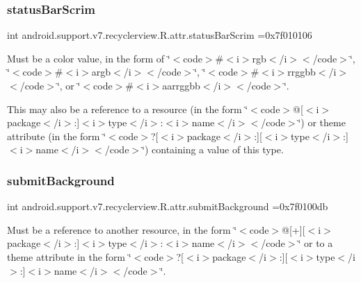 \subsubsection{\texorpdfstring{status\+Bar\+Scrim}{statusBarScrim}}
{\footnotesize\ttfamily int android.\+support.\+v7.\+recyclerview.\+R.\+attr.\+status\+Bar\+Scrim =0x7f010106\hspace{0.3cm}{\ttfamily [static]}}

Must be a color value, in the form of \char`\"{}$<$code$>$\#$<$i$>$rgb$<$/i$>$$<$/code$>$\char`\"{}, \char`\"{}$<$code$>$\#$<$i$>$argb$<$/i$>$$<$/code$>$\char`\"{}, \char`\"{}$<$code$>$\#$<$i$>$rrggbb$<$/i$>$$<$/code$>$\char`\"{}, or \char`\"{}$<$code$>$\#$<$i$>$aarrggbb$<$/i$>$$<$/code$>$\char`\"{}. 

This may also be a reference to a resource (in the form \char`\"{}$<$code$>$@\mbox{[}$<$i$>$package$<$/i$>$\+:\mbox{]}$<$i$>$type$<$/i$>$\+:$<$i$>$name$<$/i$>$$<$/code$>$\char`\"{}) or theme attribute (in the form \char`\"{}$<$code$>$?\mbox{[}$<$i$>$package$<$/i$>$\+:\mbox{]}\mbox{[}$<$i$>$type$<$/i$>$\+:\mbox{]}$<$i$>$name$<$/i$>$$<$/code$>$\char`\"{}) containing a value of this type. \mbox{\label{classandroid_1_1support_1_1v7_1_1recyclerview_1_1R_1_1attr_aa40fe069aae9a3cedc2e2e498e2bdb08}} 
\subsubsection{\texorpdfstring{submit\+Background}{submitBackground}}
{\footnotesize\ttfamily int android.\+support.\+v7.\+recyclerview.\+R.\+attr.\+submit\+Background =0x7f0100db\hspace{0.3cm}{\ttfamily [static]}}

Must be a reference to another resource, in the form \char`\"{}$<$code$>$@\mbox{[}+\mbox{]}\mbox{[}$<$i$>$package$<$/i$>$\+:\mbox{]}$<$i$>$type$<$/i$>$\+:$<$i$>$name$<$/i$>$$<$/code$>$\char`\"{} or to a theme attribute in the form \char`\"{}$<$code$>$?\mbox{[}$<$i$>$package$<$/i$>$\+:\mbox{]}\mbox{[}$<$i$>$type$<$/i$>$\+:\mbox{]}$<$i$>$name$<$/i$>$$<$/code$>$\char`\"{}. \mbox{\label{classandroid_1_1support_1_1v7_1_1recyclerview_1_1R_1_1attr_a1708411dbd639869fec62a4180dcc279}} 
